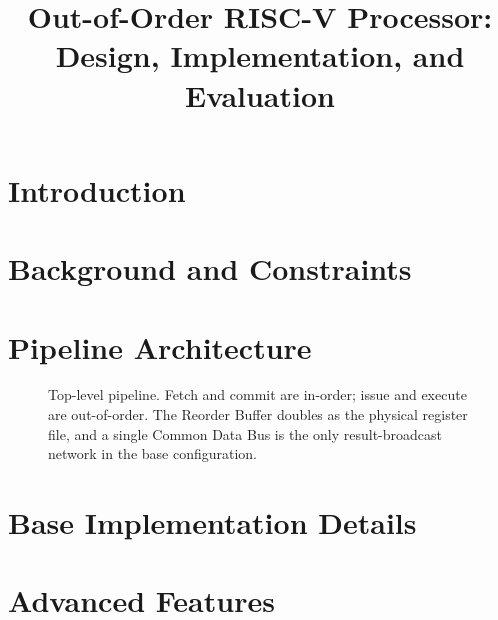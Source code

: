 \documentclass[conference]{IEEEtran}
\begin{document}
\title{Out-of-Order RISC-V Processor: Design, Implementation, and Evaluation}

\author{
}

\maketitle

\begin{abstract}
\end{abstract}

\section{Introduction}

\section{Background and Constraints}

\section{Pipeline Architecture}

\begin{figure}[t]
    \centering
    
    \caption{Top-level pipeline. Fetch and commit are in-order; issue and execute are out-of-order. The Reorder Buffer doubles as the physical register file, and a single Common Data Bus is the only result-broadcast network in the base configuration.}
    \label{fig:pipeline}
\end{figure}

\section{Base Implementation Details}

\section{Advanced Features}

\end{document}
